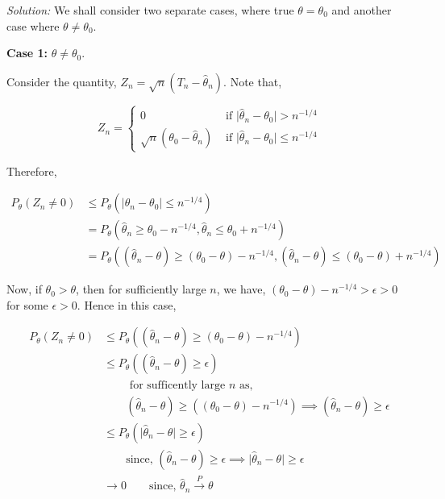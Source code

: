 \documentclass[12pt]{article}
\theoremstyle{definition}
\newenvironment{answer}{\textit{Solution: }\quad }{ \hfill \qedsymbol}
\begin{document}
\begin{answer}
	We shall consider two separate cases, where true $\theta = \theta_0$ and another case where $\theta \neq \theta_0$.
	
	\textbf{Case 1:} $\theta \neq \theta_0$.

	Consider the quantity, $Z_n = \sqrt{n} (T_n - \widehat{\theta}_n)$. Note that,

	$$
	Z_n = \begin{cases}
		0 & \text{ if } \vert \widehat{\theta}_n - \theta_0 \vert > n^{-1/4}\\
		\sqrt{n} (\theta_0 - \widehat{\theta}_n) & \text{ if } \vert \widehat{\theta}_n - \theta_0 \vert \leq n^{-1/4}
	\end{cases}
	$$

	Therefore,

	\begin{align*}
		P_{\theta} (Z_n \neq 0) 
		& \leq P_{\theta} \left( \vert \widehat{\theta}_n - \theta_0 \vert \leq n^{-1/4} \right)\\
		& = P_{\theta} \left( \widehat{\theta}_n \geq \theta_0 - n^{-1/4}, \widehat{\theta}_n \leq \theta_0 + n^{-1/4} \right)\\
		& = P_{\theta} \left( (\widehat{\theta}_n - \theta) \geq (\theta_0 - \theta) - n^{-1/4}, (\widehat{\theta}_n - \theta) \leq (\theta_0 - \theta) + n^{-1/4} \right)
	\end{align*}

	Now, if $\theta_0 > \theta$, then for sufficiently large $n$, we have, $(\theta_0 - \theta) - n^{-1/4} > \epsilon > 0$ for some $\epsilon > 0$. Hence in this case,

	\begin{align*}
		P_{\theta} (Z_n \neq 0) 
		& \leq P_{\theta} \left( (\widehat{\theta}_n - \theta) \geq (\theta_0 - \theta) - n^{-1/4} \right)\\
		& \leq P_{\theta} \left( (\widehat{\theta}_n - \theta) \geq \epsilon \right)\\
		& \qquad \text{ for sufficently large } n \text{ as, }\\
		& \qquad (\widehat{\theta}_n - \theta) \geq ((\theta_0 - \theta) - n^{-1/4}) \implies (\widehat{\theta}_n - \theta) \geq \epsilon\\
		& \leq P_{\theta} \left(\vert \widehat{\theta}_n - \theta \vert \geq \epsilon \right)\\
		& \qquad \text{since, } (\widehat{\theta}_n - \theta) \geq \epsilon \implies \vert \widehat{\theta}_n - \theta \vert \geq \epsilon\\
		& \rightarrow 0 \qquad \text{since, } \widehat{\theta}_n \xrightarrow{P} \theta
	\end{align*}


\end{answer}
\end{document}
